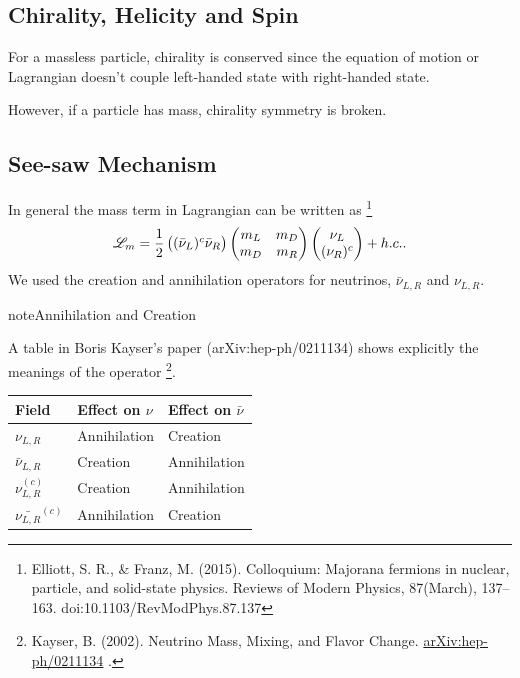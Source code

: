 \documentclass[letterpaper,12pt,english]{sphinxmanual}
\begin{document}
\subsection{Chirality, Helicity and Spin}
\label{mass:chirality-helicity-and-spin}
For a massless particle, chirality is conserved since the equation of motion or Lagrangian doesn't couple left-handed state with right-handed state.

However, if a particle has mass, chirality symmetry is broken.


\subsection{See-saw Mechanism}
\label{mass:see-saw-mechanism}
In general the mass term in Lagrangian can be written as \footnote{
Elliott, S. R., \& Franz, M. (2015). Colloquium: Majorana fermions in nuclear, particle, and solid-state physics. Reviews of Modern Physics, 87(March), 137–163. doi:10.1103/RevModPhys.87.137
}
\begin{gather}
\begin{split}\mathscr{L}_m = \frac{1}{2} \begin{pmatrix} (\bar\nu_L)^c \bar\nu_R \end{pmatrix}\begin{pmatrix} m_L & m_D \\ m_D & m_R  \end{pmatrix} \begin{pmatrix}  \nu_L \\ (\nu_R)^c \end{pmatrix} + h.c. .\end{split}\notag
\end{gather}
We used the creation and annihilation operators for neutrinos, \(\bar\nu_{L,R}\) and \(\nu_{L,R}\).

\begin{notice}{note}{Annihilation and Creation}

A table in Boris Kayser's paper (arXiv:hep-ph/0211134) shows explicitly the meanings of the operator \footnote{
Kayser, B. (2002). Neutrino Mass, Mixing, and Flavor Change. \href{http://arxiv.org/abs/hep-ph/0211134}{arXiv:hep-ph/0211134} .
}.

\begin{tabulary}{\linewidth}{|L|L|L|}
\hline

Field
 & 
Effect on \(\nu\)
 & 
Effect on \(\bar\nu\)
\\
\hline
\(\nu_{L,R}\)
 & 
Annihilation
 & 
Creation
\\
\hline
\(\bar\nu_{L,R}\)
 & 
Creation
 & 
Annihilation
\\
\hline
\(\nu_{L,R}^{(c)}\)
 & 
Creation
 & 
Annihilation
\\
\hline
\(\bar{\nu_{L,R}}^{(c)}\)
 & 
Annihilation
 & 
Creation
\\
\hline\end{tabulary}

\end{notice}
\end{document}
